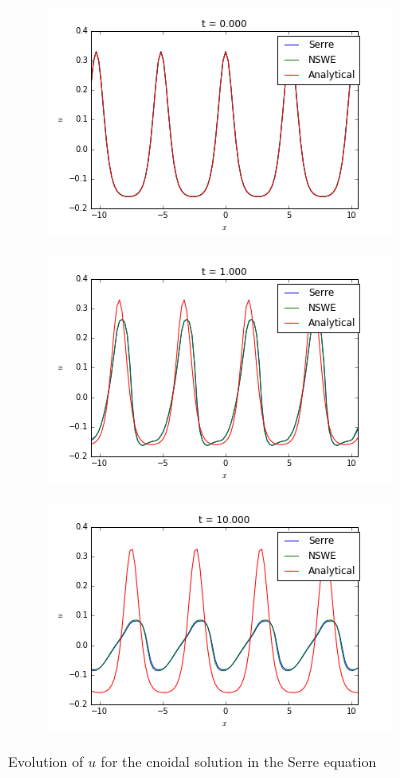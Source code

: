 \begin{figure}[h!]
	\begin{subfigure}{.3\linewidth}
		\includegraphics[scale=.3]{figures/Serre/cnoidal1u.png}	
	\end{subfigure}
	\begin{subfigure}{.3\linewidth}
		\includegraphics[scale=.3]{figures/Serre/cnoidal2u.png}	
	\end{subfigure}
	\begin{subfigure}{.3\linewidth}
		\includegraphics[scale=.3]{figures/Serre/cnoidal3u.png}	
	\end{subfigure}
	\caption{Evolution of $u$ for the cnoidal solution in the Serre equation \label{fig:cnoidalu}}
\end{figure}

